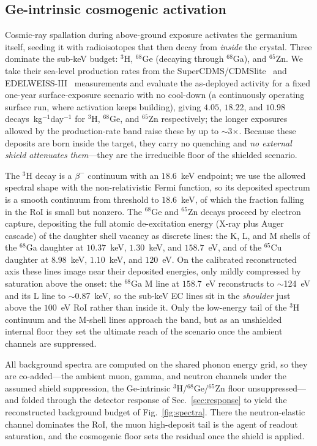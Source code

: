 \subsection{Ge-intrinsic cosmogenic activation}
\label{sec:cosmogenic}

Cosmic-ray spallation during above-ground exposure activates the germanium
itself, seeding it with radioisotopes that then decay from \emph{inside} the
crystal. Three dominate the sub-keV budget: $^{3}$H, $^{68}$Ge (decaying
through $^{68}$Ga), and $^{65}$Zn. We take their sea-level production rates
from the SuperCDMS/CDMSlite~\cite{amman2019} and EDELWEISS-III~%
\cite{edelweiss2017} measurements and evaluate the as-deployed activity for
a fixed one-year surface-exposure scenario with no cool-down (a
continuously operating surface run, where activation keeps building), giving
$4.05$, $18.22$, and $10.98$ decays~kg$^{-1}$day$^{-1}$ for
$^{3}$H, $^{68}$Ge, and $^{65}$Zn respectively; the longer exposures allowed
by the production-rate band raise these by up to $\sim$3$\times$. Because
these deposits are born inside the target, they carry no quenching and
\emph{no external shield attenuates them}---they are the irreducible floor
of the shielded scenario.

The $^{3}$H decay is a $\beta^-$ continuum with an $18.6$~keV endpoint; we
use the allowed spectral shape with the non-relativistic Fermi function, so
its deposited spectrum is a smooth continuum from threshold to $18.6$~keV,
of which the fraction falling in the RoI is small but nonzero. The $^{68}$Ge
and $^{65}$Zn decays proceed by electron capture, depositing the full
atomic de-excitation energy (X-ray plus Auger cascade) of the daughter shell
vacancy as discrete lines: the K, L, and M shells of the $^{68}$Ga daughter
at $10.37$~keV, $1.30$~keV, and $158.7$~eV, and of the $^{65}$Cu daughter at
$8.98$~keV, $1.10$~keV, and $120$~eV. On the calibrated reconstructed axis
these lines image near their deposited energies, only mildly compressed by
saturation above the onset: the $^{68}$Ga M line at $158.7$~eV reconstructs
to $\sim$124~eV and its L line to $\sim$0.87~keV, so the sub-keV EC lines sit
in the \emph{shoulder} just above the $100$~eV RoI rather than inside it.
Only the low-energy tail of the $^{3}$H continuum and the M-shell lines
approach the band, but as an unshielded internal floor they set the ultimate
reach of the scenario once the ambient channels are suppressed.

All background spectra are computed on the shared phonon energy grid, so
they are co-added---the ambient muon, gamma, and neutron channels under the
assumed shield suppression, the Ge-intrinsic $^{3}$H/$^{68}$Ge/$^{65}$Zn
floor unsuppressed---and folded through the detector response of
Sec.~\ref{sec:response} to yield the reconstructed background budget of
Fig.~\ref{fig:spectra}. There the neutron-elastic channel dominates the
RoI, the muon high-deposit tail is the agent of readout saturation, and the
cosmogenic floor sets the residual once the shield is applied.
